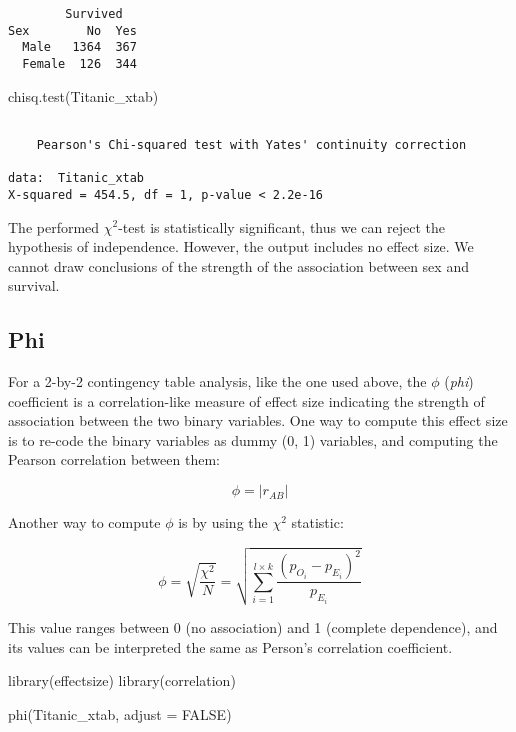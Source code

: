 \documentclass[mathematics,article,submit,moreauthors,pdftex]{mdpi}
\newenvironment{Shaded}{\begin{snugshade}}{\end{snugshade}}
\newcommand{\AttributeTok}[1]{\textcolor[rgb]{0.77,0.63,0.00}{#1}}
\newcommand{\ConstantTok}[1]{\textcolor[rgb]{0.00,0.00,0.00}{#1}}
\newcommand{\FunctionTok}[1]{\textcolor[rgb]{0.00,0.00,0.00}{#1}}
\newcommand{\NormalTok}[1]{#1}
\begin{document}
\begin{verbatim}
        Survived
Sex        No  Yes
  Male   1364  367
  Female  126  344
\end{verbatim}

\begin{Shaded}
\begin{Highlighting}[]
\FunctionTok{chisq.test}\NormalTok{(Titanic\_xtab)}
\end{Highlighting}
\end{Shaded}

\begin{verbatim}

    Pearson's Chi-squared test with Yates' continuity correction

data:  Titanic_xtab
X-squared = 454.5, df = 1, p-value < 2.2e-16
\end{verbatim}

The performed \(\chi^2\)-test is statistically significant, thus we can
reject the hypothesis of independence. However, the output includes no
effect size. We cannot draw conclusions of the strength of the
association between sex and survival.

\hypertarget{phi}{%
\subsection{Phi}\label{phi}}

For a 2-by-2 contingency table analysis, like the one used above, the
\(\phi\) (\emph{phi}) coefficient is a correlation-like measure of
effect size indicating the strength of association between the two
binary variables. One way to compute this effect size is to re-code the
binary variables as dummy (0, 1) variables, and computing the Pearson
correlation between them:

\[
\phi = |r_{AB}|
\]

Another way to compute \(\phi\) is by using the \(\chi^2\) statistic:

\[
\phi = \sqrt{\frac{\chi^2}{N}} = \sqrt{\sum_{i=1}^{l\times k}{\frac{(p_{O_i}-p_{E_i})^2}{p_{E_i}}}}
\]

This value ranges between 0 (no association) and 1 (complete
dependence), and its values can be interpreted the same as Person's
correlation coefficient.

\begin{Shaded}
\begin{Highlighting}[]
\FunctionTok{library}\NormalTok{(effectsize)}
\FunctionTok{library}\NormalTok{(correlation)}

\FunctionTok{phi}\NormalTok{(Titanic\_xtab, }\AttributeTok{adjust =} \ConstantTok{FALSE}\NormalTok{)}
\end{Highlighting}
\end{Shaded}
\end{document}
